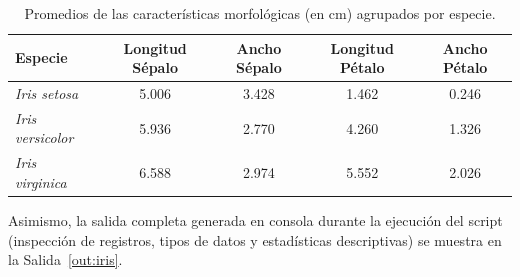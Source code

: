 \documentclass[11pt,letterpaper]{article}
\begin{document}
\begin{table}[htbp]
\centering
\caption{Promedios de las características morfológicas (en cm) agrupados por especie.}
\label{tab:promedios_iris}
\begin{tabular}{lcccc}
\hline
\textbf{Especie} & \textbf{Longitud Sépalo} & \textbf{Ancho Sépalo} & \textbf{Longitud Pétalo} & \textbf{Ancho Pétalo} \\
\hline
\textit{Iris setosa}     & 5.006 & 3.428 & 1.462 & 0.246 \\
\textit{Iris versicolor} & 5.936 & 2.770 & 4.260 & 1.326 \\
\textit{Iris virginica}  & 6.588 & 2.974 & 5.552 & 2.026 \\
\hline
\end{tabular}
\end{table}

Asimismo, la salida completa generada en consola durante la ejecución del script (inspección de registros, tipos de datos y estadísticas descriptivas) se muestra en la Salida~\ref{out:iris}.
\end{document}
